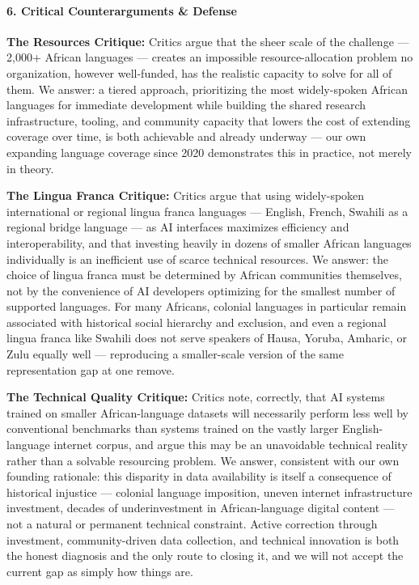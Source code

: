 \paragraph{6. Critical Counterarguments \&
Defense}\label{critical-counterarguments-defense-48}

\textbf{The Resources Critique:} Critics argue that the sheer scale of
the challenge --- 2,000+ African languages --- creates an impossible
resource-allocation problem no organization, however well-funded, has
the realistic capacity to solve for all of them. We answer: a tiered
approach, prioritizing the most widely-spoken African languages for
immediate development while building the shared research infrastructure,
tooling, and community capacity that lowers the cost of extending
coverage over time, is both achievable and already underway --- our own
expanding language coverage since 2020 demonstrates this in practice,
not merely in theory.

\textbf{The Lingua Franca Critique:} Critics argue that using
widely-spoken international or regional lingua franca languages ---
English, French, Swahili as a regional bridge language --- as AI
interfaces maximizes efficiency and interoperability, and that investing
heavily in dozens of smaller African languages individually is an
inefficient use of scarce technical resources. We answer: the choice of
lingua franca must be determined by African communities themselves, not
by the convenience of AI developers optimizing for the smallest number
of supported languages. For many Africans, colonial languages in
particular remain associated with historical social hierarchy and
exclusion, and even a regional lingua franca like Swahili does not serve
speakers of Hausa, Yoruba, Amharic, or Zulu equally well --- reproducing
a smaller-scale version of the same representation gap at one remove.

\textbf{The Technical Quality Critique:} Critics note, correctly, that
AI systems trained on smaller African-language datasets will necessarily
perform less well by conventional benchmarks than systems trained on the
vastly larger English-language internet corpus, and argue this may be an
unavoidable technical reality rather than a solvable resourcing problem.
We answer, consistent with our own founding rationale: this disparity in
data availability is itself a consequence of historical injustice ---
colonial language imposition, uneven internet infrastructure investment,
decades of underinvestment in African-language digital content --- not a
natural or permanent technical constraint. Active correction through
investment, community-driven data collection, and technical innovation
is both the honest diagnosis and the only route to closing it, and we
will not accept the current gap as simply how things are.

